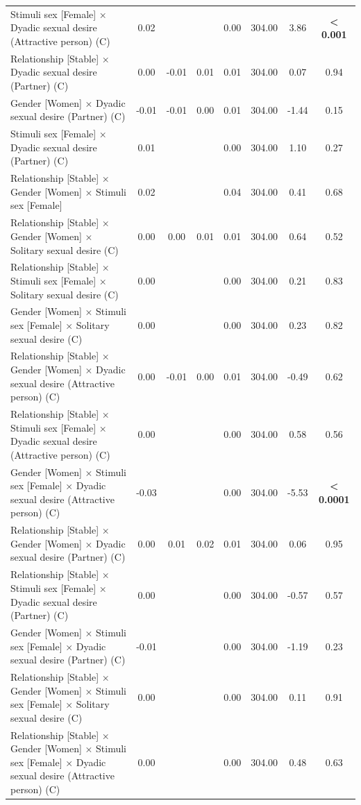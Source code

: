 \documentclass[
  bookmarksnumbered]{article}
\begin{document}
\begin{table}[H]
{\begin{threeparttable}
\begin{tabular}[t]{lccccccc}
Stimuli sex [Female] × Dyadic sexual desire (Attractive person) (C) & 0.02 &  &  & 0.00 & 304.00 & 3.86 & \textbf{< 0.001}\\
Relationship [Stable] × Dyadic sexual desire (Partner) (C) & 0.00 & -0.01 & 0.01 & 0.01 & 304.00 & 0.07 & 0.94\\
Gender [Women] × Dyadic sexual desire (Partner) (C) & -0.01 & -0.01 & 0.00 & 0.01 & 304.00 & -1.44 & 0.15\\
Stimuli sex [Female] × Dyadic sexual desire (Partner) (C) & 0.01 &  &  & 0.00 & 304.00 & 1.10 & 0.27\\
Relationship [Stable] × Gender [Women] × Stimuli sex [Female] & 0.02 &  &  & 0.04 & 304.00 & 0.41 & 0.68\\
Relationship [Stable] × Gender [Women] × Solitary sexual desire (C) & 0.00 & 0.00 & 0.01 & 0.01 & 304.00 & 0.64 & 0.52\\
Relationship [Stable] × Stimuli sex [Female] × Solitary sexual desire (C) & 0.00 &  &  & 0.00 & 304.00 & 0.21 & 0.83\\
Gender [Women] × Stimuli sex [Female] × Solitary sexual desire (C) & 0.00 &  &  & 0.00 & 304.00 & 0.23 & 0.82\\
Relationship [Stable] × Gender [Women] × Dyadic sexual desire (Attractive person) (C) & 0.00 & -0.01 & 0.00 & 0.01 & 304.00 & -0.49 & 0.62\\
Relationship [Stable] × Stimuli sex [Female] × Dyadic sexual desire (Attractive person) (C) & 0.00 &  &  & 0.00 & 304.00 & 0.58 & 0.56\\
Gender [Women] × Stimuli sex [Female] × Dyadic sexual desire (Attractive person) (C) & -0.03 &  &  & 0.00 & 304.00 & -5.53 & \textbf{< 0.0001}\\
Relationship [Stable] × Gender [Women] × Dyadic sexual desire (Partner) (C) & 0.00 & 0.01 & 0.02 & 0.01 & 304.00 & 0.06 & 0.95\\
Relationship [Stable] × Stimuli sex [Female] × Dyadic sexual desire (Partner) (C) & 0.00 &  &  & 0.00 & 304.00 & -0.57 & 0.57\\
Gender [Women] × Stimuli sex [Female] × Dyadic sexual desire (Partner) (C) & -0.01 &  &  & 0.00 & 304.00 & -1.19 & 0.23\\
Relationship [Stable] × Gender [Women] × Stimuli sex [Female] × Solitary sexual desire (C) & 0.00 &  &  & 0.00 & 304.00 & 0.11 & 0.91\\
Relationship [Stable] × Gender [Women] × Stimuli sex [Female] × Dyadic sexual desire (Attractive person) (C) & 0.00 &  &  & 0.00 & 304.00 & 0.48 & 0.63\\

\end{tabular}
\end{threeparttable}}
\end{table}
\end{document}
